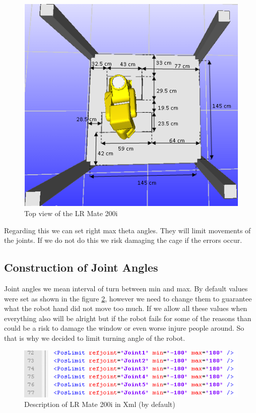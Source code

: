 \begin{figure}[H]
  \centering
  \includegraphics[scale= 0.7]{source/robworkCageDimensions.png}
  \caption{Top view of the LR Mate 200i}
  \label{fig:robworkCageDimensions}
\end{figure}

Regarding this we can set right max theta angles. They will limit movements of the joints. If we do not do this we risk damaging the cage if the errors occur.

\subsection{Construction of Joint Angles}
Joint angles we mean interval of turn between min and max. By default values were set as shown in the figure \ref{fig:angleDefaultXML}, however we need to change them to guarantee what the robot hand did not move too much. If we allow all these values when everything also will be alright but if the robot fails for some of the reasons than could be a risk to damage the window or even worse injure people around. So that is why we decided to limit turning angle of the robot. 

\begin{figure}[H]
  \centering
  \includegraphics[scale= 0.8]{source/angleDefaultXML.png}
  \caption{Description of LR Mate 200i in Xml (by default)}
  \label{fig:angleDefaultXML}
\end{figure}

